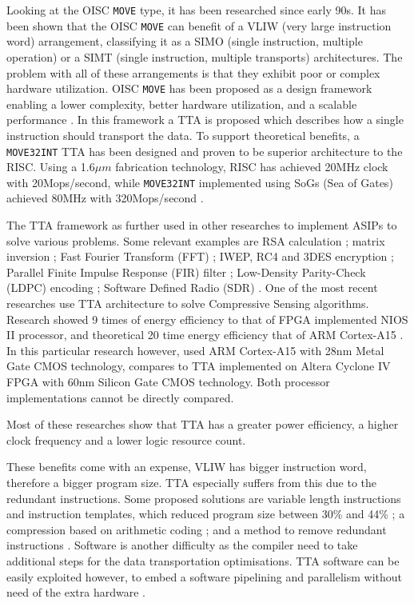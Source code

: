 Looking at the OISC \texttt{MOVE} type, it has been researched since early 90s. It has been shown that the OISC \texttt{MOVE} can benefit of a VLIW (very large instruction word) arrangement, classifying it as a SIMO (single instruction, multiple operation) or a SIMT (single instruction, multiple transports) architectures. The problem with all of these arrangements is that they exhibit poor or complex hardware utilization. OISC \texttt{MOVE} has been proposed as a design framework enabling a lower complexity, better hardware utilization, and a scalable performance \autocite{5348869}. In this framework a TTA is proposed which describes how a single instruction should transport the data. To support theoretical benefits, a \texttt{MOVE32INT} TTA has been designed \autocite{Corporaal94move32int} and proven to be superior architecture to the RISC. Using a 1.6$\mu m$ fabrication technology, RISC has achieved 20MHz clock with 20Mops/second, while \texttt{MOVE32INT} implemented using SoGs (Sea of Gates) achieved 80MHz with 320Mops/second \autocite{289981}.

The TTA framework as further used in other researches to implement ASIPs to solve various problems. Some relevant examples are RSA calculation \autocite{6128530}; matrix inversion \autocite{1540373}; Fast Fourier Transform (FFT) \autocite{8682289}; IWEP, RC4 and 3DES encryption \autocite{922340}; Parallel Finite Impulse Response (FIR) filter \autocite{1511285}; Low-Density Parity-Check (LDPC) encoding \autocite{6855236}; Software Defined Radio (SDR) \autocite{7363689}. One of the most recent researches use TTA architecture to solve Compressive Sensing algorithms. Research showed 9 times of energy efficiency to that of FPGA implemented NIOS II processor, and theoretical 20 time energy efficiency that of ARM Cortex-A15 \autocite{8573494}. In this particular research however, used ARM Cortex-A15 with 28nm Metal Gate CMOS technology, compares to TTA implemented on Altera Cyclone IV FPGA with 60nm Silicon Gate CMOS technology. Both processor implementations cannot be directly compared.

Most of these researches show that TTA has a greater power efficiency, a higher clock frequency and a lower logic resource count. 

These benefits come with an expense, VLIW has bigger instruction word, therefore a bigger program size. TTA especially suffers from this due to the redundant instructions. Some proposed solutions are variable length instructions and instruction templates, which reduced program size between 30\% and 44\% \autocite{1213033,6893206}; a compression based on arithmetic coding \autocite{4627144}; and a method to remove redundant instructions \autocite{5403730}. 
Software is another difficulty as the compiler need to take additional steps for the data transportation optimisations. TTA software can be easily exploited however, to embed a software pipelining and parallelism without need of the extra hardware \autocite{4595596}.

